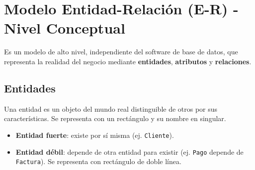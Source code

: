 \documentclass[12pt,a4paper,openany,oneside]{book}
\begin{document}
\begin{center}
\end{center}

\section{Modelo Entidad-Relación (E-R) - Nivel Conceptual}
Es un modelo de alto nivel, independiente del software de base de datos, que representa la realidad del negocio mediante \textbf{entidades}, \textbf{atributos} y \textbf{relaciones}.

\subsection{Entidades}
Una entidad es un objeto del mundo real distinguible de otros por sus características. Se representa con un rectángulo y su nombre en singular.
\begin{itemize}
    \item \textbf{Entidad fuerte}: existe por sí misma (ej. \texttt{Cliente}).
    \item \textbf{Entidad débil}: depende de otra entidad para existir (ej. \texttt{Pago} depende de \texttt{Factura}). Se representa con rectángulo de doble línea.
\end{itemize}
\end{document}
